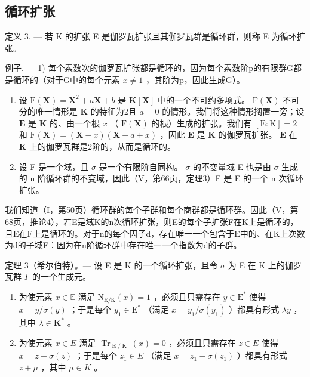 \subsection{循环扩张}

定义 3. --- 若 K 的扩张 E 是伽罗瓦扩张且其伽罗瓦群是循环群，则称 E 为循环扩张。

例子. --- 1) 每个素数次的伽罗瓦扩张都是循环的，因为每个素数阶p的有限群G都是循环的（对于G中的每个元素 \(x \neq 1\) ，其阶为p，因此生成G）。

\begin{enumerate}
\def\labelenumi{\arabic{enumi})}
\setcounter{enumi}{1}
\item
  设 \(\mathrm{F}(\mathbf{X}) = \mathbf{X}^2 + a\mathbf{X} + b\) 是 \(\mathbf{K}[\mathbf{X}]\) 中的一个不可约多项式。 \(\mathrm{F}(\mathbf{X})\) 不可分的唯一情形是 \(\mathbf{K}\) 的特征为2且 \(a = 0\) 的情形。我们将这种情形搁置一旁；设 \(\mathbf{E}\) 是 \(\mathbf{K}\) 的、由一个根 \(x\) （ \(\mathrm{F}(\mathbf{X})\) 的根）生成的扩张。我们有 \([\mathrm{E}:\mathrm{K}] = 2\) 和 \(\mathrm{F}(\mathbf{X}) = (\mathbf{X} - x)(\mathbf{X} + a + x)\) ，因此 \(\mathbf{E}\) 是 \(\mathbf{K}\) 的伽罗瓦扩张。 \(\mathbf{E}\) 在 \(\mathbf{K}\) 上的伽罗瓦群是2阶的，从而是循环的。
\item
  设 F 是一个域，且 \(\sigma\) 是一个有限阶自同构。 \(\sigma\) 的不变量域 E 也是由 \(\sigma\) 生成的 n 阶循环群的不变域，因此（V，第66页，定理3）F 是 E 的一个 n 次循环扩张。
\end{enumerate}

我们知道（I，第50页）循环群的每个子群和每个商群都是循环群。因此（V，第68页，推论4），若E是域K的n次循环扩张，则E的每个子扩张F在K上是循环的，且E在F上是循环的。对于n的每个因子d，存在唯一一个包含于E中的、在K上次数为d的子域F：因为在n阶循环群中存在唯一一个指数为d的子群。

定理 3（希尔伯特）。--- 设 E 是 K 的一个循环扩张，且令 \(\sigma\) 为 E 在 K 上的伽罗瓦群 \(\Gamma\) 的一个生成元。

\begin{enumerate}
\def\labelenumi{\alph{enumi})}
\item
  为使元素 \(x \in \mathbb{E}\) 满足 \(\mathrm{N}_{\mathrm{E} / \mathrm{K}}(x) = 1\) ，必须且只需存在 \(y \in \mathrm{E}^*\) 使得 \(x = y / \sigma(y)\) ；于是每个 \(y_1 \in \mathrm{E}^*\) （满足 \(x = y_1 / \sigma(y_1)\) ）都具有形式 \(\lambda y\) ，其中 \(\lambda \in \mathbf{K}^*\) 。
\item
  为使元素 \(x \in E\) 满足 \(\operatorname{Tr}_{\operatorname{E}/\operatorname{K}}(x) = 0\) ，必须且只需存在 \(z \in E\) 使得 \(x = z - \sigma(z)\) ；于是每个 \(z_{1} \in E\) （满足 \(x = z_{1} - \sigma(z_{1})\) ）都具有形式 \(z + \mu\) ，其中 \(\mu \in K\) 。
\end{enumerate}

